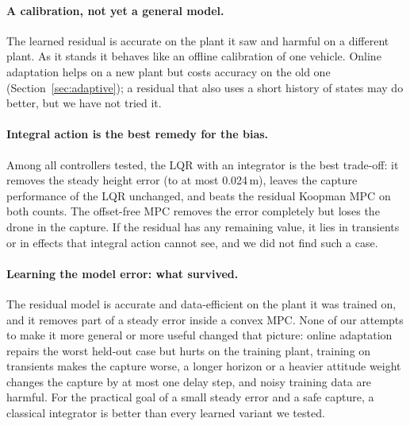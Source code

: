 \paragraph{A calibration, not yet a general model.} The learned residual is accurate on the plant it saw and harmful on a different plant. As it stands it behaves like an offline calibration of one vehicle. Online adaptation helps on a new plant but costs accuracy on the old one (Section~\ref{sec:adaptive}); a residual that also uses a short history of states may do better, but we have not tried it.

\paragraph{Integral action is the best remedy for the bias.} Among all controllers tested, the LQR with an integrator is the best trade-off: it removes the steady height error (to at most 0.024\,m), leaves the capture performance of the LQR unchanged, and beats the residual Koopman MPC on both counts. The offset-free MPC removes the error completely but loses the drone in the capture. If the residual has any remaining value, it lies in transients or in effects that integral action cannot see, and we did not find such a case.

\paragraph{Learning the model error: what survived.} The residual model is accurate and data-efficient on the plant it was trained on, and it removes part of a steady error inside a convex MPC. None of our attempts to make it more general or more useful changed that picture: online adaptation repairs the worst held-out case but hurts on the training plant, training on transients makes the capture worse, a longer horizon or a heavier attitude weight changes the capture by at most one delay step, and noisy training data are harmful. For the practical goal of a small steady error and a safe capture, a classical integrator is better than every learned variant we tested.

